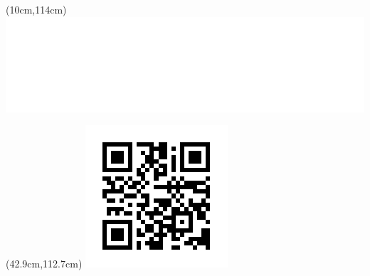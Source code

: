 \documentclass[final,12pt]{beamer} %
\begin{document}
\begin{frame}
\begin{textblock*}{11cm}(10cm,114cm)
 \includegraphics[width=\columnwidth]{./logos/logo_qmul.png}
\end{textblock*}



\begin{textblock*}{5.5cm}(42.9cm,112.7cm)
 \includegraphics[width=\columnwidth]{./figs/qrcode.png}
\end{textblock*}


%
%
%



\end{frame}
\end{document}

